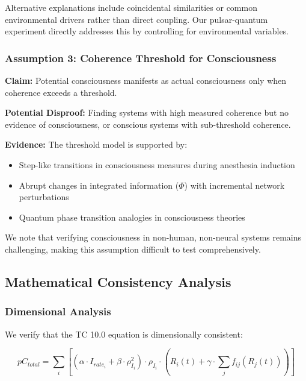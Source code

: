 \documentclass[12pt]{article}
\begin{document}
Alternative explanations include coincidental similarities or common environmental drivers rather than direct coupling. Our pulsar-quantum experiment directly addresses this by controlling for environmental variables.

\subsubsection{Assumption 3: Coherence Threshold for Consciousness}

\textbf{Claim:} Potential consciousness manifests as actual consciousness only when coherence exceeds a threshold.

\textbf{Potential Disproof:} Finding systems with high measured coherence but no evidence of consciousness, or conscious systems with sub-threshold coherence.

\textbf{Evidence:} The threshold model is supported by:

\begin{itemize}
    \item Step-like transitions in consciousness measures during anesthesia induction \cite{chennu2014}
    \item Abrupt changes in integrated information ($\Phi$) with incremental network perturbations \cite{tononi2016}
    \item Quantum phase transition analogies in consciousness theories \cite{hameroff2014}
\end{itemize}

We note that verifying consciousness in non-human, non-neural systems remains challenging, making this assumption difficult to test comprehensively.

\subsection{Mathematical Consistency Analysis}

\subsubsection{Dimensional Analysis}

We verify that the TC 10.0 equation is dimensionally consistent:

\begin{equation}
pC_{total} = \sum_{i} [(α \cdot I_{rate_i} + β \cdot ρ_{I_i}^2) \cdot ρ_{I_i} \cdot (R_i(t) + γ \cdot \sum_{j} f_{ij}(R_j(t)))]
\end{equation}
\end{document}

